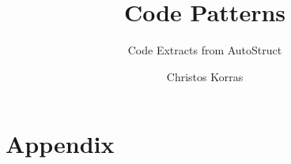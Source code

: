 \documentclass[fontsize=11pt,paper=a4,pagesize=auto]{scrbook}
\begin{document}
\title{Code Patterns}
\subtitle{Code Extracts from AutoStruct}
\author{Christos Korras}
\date{}
\maketitle
\tableofcontents

\appendix
\part{Appendix}


\printbibliography[title={Bibliography}]
\end{document}
